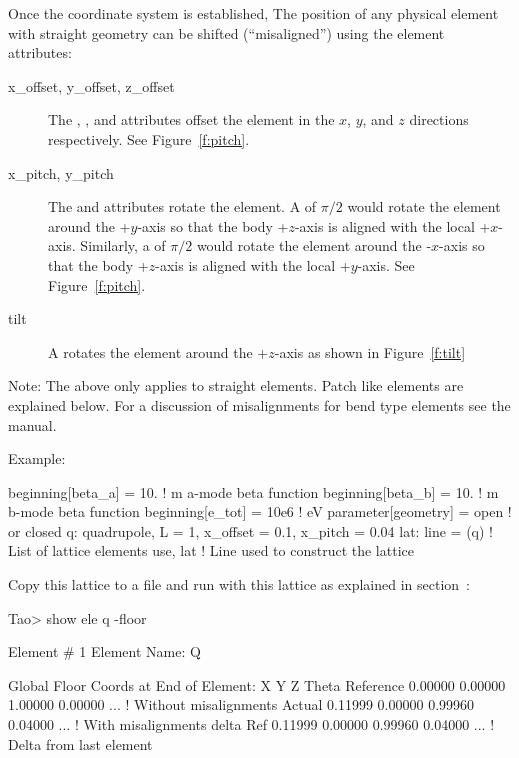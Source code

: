 \documentclass{hitec}
\begin{document}
Once the  coordinate system is established, The position of any physical element with straight geometry can
be shifted (``misaligned'') using the element attributes:
\begin{description}
\item[x_offset, y_offset, z_offset]
The , , and  attributes offset the element in the $x$, $y$,
and $z$ directions respectively. See Figure~\ref{f:pitch}.
\item[x_pitch, y_pitch]
The  and  attributes rotate the element. A  of $\pi/2$ would rotate the
element around the +$y$-axis so that the body +$z$-axis is aligned with the local
+$x$-axis. Similarly, a  of $\pi/2$ would rotate the element around the -$x$-axis so
that the body +$z$-axis is aligned with the local +$y$-axis. See Figure~\ref{f:pitch}.
\item[tilt]
A  rotates the element around the +$z$-axis as shown in Figure~\ref{f:tilt}
\end{description}

Note: The above only applies to straight elements. Patch like elements are explained below. For a
discussion of misalignments for bend type elements see the \bmad manual.

Example:
{\small
\begin{code}
beginning[beta_a] = 10.   ! m  a-mode beta function
beginning[beta_b] = 10.   ! m  b-mode beta function
beginning[e_tot] = 10e6   ! eV
parameter[geometry] = open  ! or closed
q: quadrupole, L = 1, x_offset = 0.1, x_pitch = 0.04
lat: line = (q)   ! List of lattice elements
use, lat          ! Line used to construct the lattice
\end{code}}

Copy this lattice to a file and run \tao with this lattice as explained in
section~:

{\small
\begin{code} 
Tao> show ele q -floor

 Element #                1
 Element Name: Q

Global Floor Coords at End of Element:
                X        Y        Z    Theta  
Reference  0.00000  0.00000  1.00000  0.00000 ... ! Without misalignments
Actual     0.11999  0.00000  0.99960  0.04000 ... ! With misalignments
delta Ref  0.11999  0.00000  0.99960  0.04000 ... ! Delta from last element
\end{code}}
\end{document}
